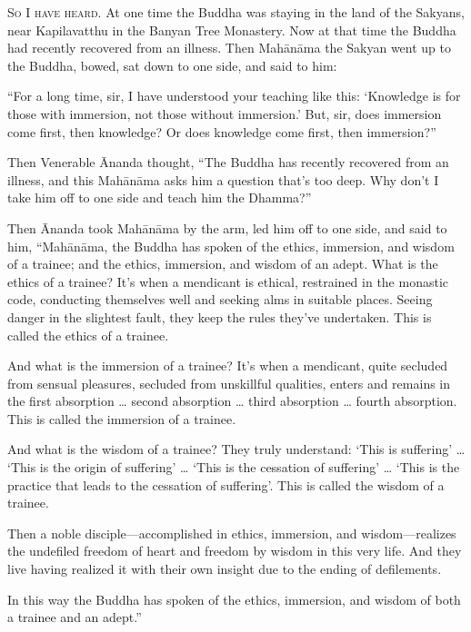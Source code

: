 \documentclass[12pt,openany]{book}%
\newcommand*{\scevam}[1]{\textsc{#1}}
\begin{document}
\scevam{So I have heard. }At one time the Buddha was staying in the land of the Sakyans, near Kapilavatthu in the Banyan Tree Monastery. Now at that time the Buddha had recently recovered from an illness. Then \textsanskrit{Mahānāma} the Sakyan went up to the Buddha, bowed, sat down to one side, and said to him: 

“For a long time, sir, I have understood your teaching like this: ‘Knowledge is for those with immersion, not those without immersion.’ But, sir, does immersion come first, then knowledge? Or does knowledge come first, then immersion?” 

Then Venerable Ānanda thought, “The Buddha has recently recovered from an illness, and this \textsanskrit{Mahānāma} asks him a question that’s too deep. Why don’t I take him off to one side and teach him the Dhamma?” 

Then Ānanda took \textsanskrit{Mahānāma} by the arm, led him off to one side, and said to him, “\textsanskrit{Mahānāma}, the Buddha has spoken of the ethics, immersion, and wisdom of a trainee; and the ethics, immersion, and wisdom of an adept. What is the ethics of a trainee? It’s when a mendicant is ethical, restrained in the monastic code, conducting themselves well and seeking alms in suitable places. Seeing danger in the slightest fault, they keep the rules they’ve undertaken. This is called the ethics of a trainee. 

And what is the immersion of a trainee? It’s when a mendicant, quite secluded from sensual pleasures, secluded from unskillful qualities, enters and remains in the first absorption … second absorption … third absorption … fourth absorption. This is called the immersion of a trainee. 

And what is the wisdom of a trainee? They truly understand: ‘This is suffering’ … ‘This is the origin of suffering’ … ‘This is the cessation of suffering’ … ‘This is the practice that leads to the cessation of suffering’. This is called the wisdom of a trainee. 

Then a noble disciple—accomplished in ethics, immersion, and wisdom—realizes the undefiled freedom of heart and freedom by wisdom in this very life. And they live having realized it with their own insight due to the ending of defilements. 

In this way the Buddha has spoken of the ethics, immersion, and wisdom of both a trainee and an adept.” 
\end{document}
